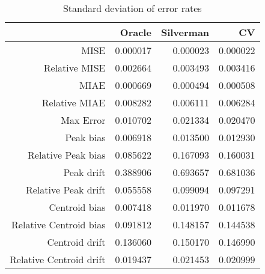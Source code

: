 \begin{table}[ht]
\centering
\begin{tabular}{rrrr}
  \hline
 & Oracle & Silverman & CV \\ 
  \hline
MISE & 0.000017 & 0.000023 & 0.000022 \\ 
  Relative MISE & 0.002664 & 0.003493 & 0.003416 \\ 
  MIAE & 0.000669 & 0.000494 & 0.000508 \\ 
  Relative MIAE & 0.008282 & 0.006111 & 0.006284 \\ 
  Max Error & 0.010702 & 0.021334 & 0.020470 \\ 
  Peak bias & 0.006918 & 0.013500 & 0.012930 \\ 
  Relative Peak bias & 0.085622 & 0.167093 & 0.160031 \\ 
  Peak drift & 0.388906 & 0.693657 & 0.681036 \\ 
  Relative Peak drift & 0.055558 & 0.099094 & 0.097291 \\ 
  Centroid bias & 0.007418 & 0.011970 & 0.011678 \\ 
  Relative Centroid bias & 0.091812 & 0.148157 & 0.144538 \\ 
  Centroid drift & 0.136060 & 0.150170 & 0.146990 \\ 
  Relative Centroid drift & 0.019437 & 0.021453 & 0.020999 \\ 
   \hline
\end{tabular}
\caption{Standard deviation of error rates} 
\label{tbl:stddev_error_rates}
\end{table}
